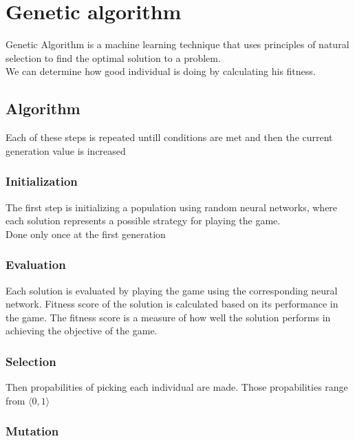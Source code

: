 \section{Genetic algorithm}
\label{sec:genetic}
Genetic Algorithm is a machine learning technique that uses principles of natural selection to find the optimal solution to a problem. \\

We can determine how good individual is doing by calculating his fitness.


\subsection{Algorithm}

Each of these steps is repeated untill conditions are met and then the current generation value is increased

\subsubsection{Initialization}

The first step is initializing a population using random neural networks, where each solution represents a possible strategy for playing the game. \\

Done only once at the first generation

\subsubsection{Evaluation}

Each solution is evaluated by playing the game using the corresponding neural network. Fitness score of the solution is calculated based on its performance in the game. The fitness score is a measure of how well the solution performs in achieving the objective of the game.

\subsubsection{Selection}

Then propabilities of picking each individual are made. Those propabilities range from $\langle0,1\rangle$

\subsubsection{Mutation}

